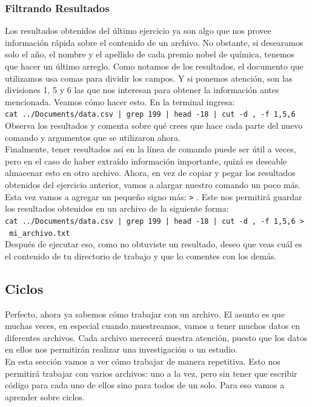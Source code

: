 \documentclass[10pt,letterpaper]{article}
\newcommand{\inlinecode}[1]{
\colorbox{light-gray}{\texttt{#1}}
}
\begin{document}
\subsubsection{Filtrando Resultados}
Los resultados obtenidos del \'ultimo ejercicio ya son algo que nos provee informaci\'on r\'apida sobre el contenido de un archivo. No obstante, si desearamos solo el a\~no, el nombre y el apellido de cada premio nobel de qu\'imica, tenemos que hacer un \'ultimo arreglo. Como notamos de los resultados, el documento que utilizamos usa comas para dividir los campos. Y si ponemos atenci\'on, son las divisiones 1, 5 y 6 las que nos interesan para obtener la informaci\'on antes mencionada. Veamos c\'omo hacer esto. En la terminal ingresa:\\
\inlinecode{cat ../Documents/data.csv | grep 199 | head -18 | cut -d , -f 1,5,6}\\
Observa los resultados y comenta sobre qu\'e crees que hace cada parte del nuevo comando y argumentos que se utilizaron ahora.\\

Finalmente, tener resultados as\'i en la l\'inea de comando puede ser \'util a veces, pero en el caso de haber extra\'ido informaci\'on importante, quiz\'a es deseable almacenar esto en otro archivo. Ahora, en vez de copiar y pegar los resultados obtenidos del ejercicio anterior, vamos a alargar nuestro comando un poco m\'as. Esta vez vamos a agregar un peque\~no signo m\'as: \inlinecode{>}. Este nos permitir\'a guardar los resultados obtenidos en un archivo de la siguiente forma:\\
\inlinecode{cat ../Documents/data.csv | grep 199 | head -18 | cut -d , -f 1,5,6 > \ mi\_archivo.txt}\\
Despu\'es de ejecutar eso, como no obtuviste un resultado, deseo que veas cu\'al es el contenido de tu directorio de trabajo y que lo comentes con los dem\'as.

\subsection{Ciclos}
Perfecto, ahora ya sabemos c\'omo trabajar con un archivo. El asunto es que muchas veces, en especial cuando muestreamos, vamos a tener muchos datos en diferentes archivos. Cada archivo merecer\'a nuestra atenci\'on, puesto que los datos en ellos nos permitir\'an realizar una investigaci\'on o un estudio.\\

En esta secci\'on vamos a ver c\'omo trabajar de manera repetitiva. Esto nos permitir\'a trabajar con varios archivos: uno a la vez, pero sin tener que escribir c\'odigo para cada uno de ellos sino para todos de un solo. Para eso vamos a aprender sobre ciclos.
\end{document}
